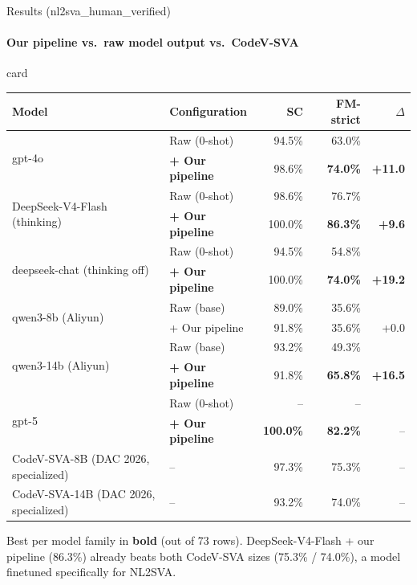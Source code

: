 \documentclass[aspectratio=169]{beamer}
\newenvironment{card}[1][\textwidth]{%
  \begin{beamercolorbox}[wd=#1,sep=8pt,rounded=true,shadow=false]{card}
}{%
  \end{beamercolorbox}
}
\begin{document}
\begin{frame}{Results (nl2sva\_human\_verified)}
  \framesubtitle{Our pipeline vs.\ raw model output vs.\ CodeV-SVA}
  \begin{card}
  \centering
  \tiny
  \renewcommand{\arraystretch}{0.85}
  \setlength{\tabcolsep}{6pt}
  \begin{tabular}{l l r r r}
    \toprule
    \textbf{Model} & \textbf{Configuration} & \textbf{SC} & \textbf{FM-strict} & \textbf{$\Delta$} \\
    \midrule
    \multirow{2}{*}{gpt-4o} & Raw (0-shot) & 94.5\% & 63.0\% & \\
      & \textbf{+ Our pipeline} & 98.6\% & \textbf{74.0\%} & \textbf{+11.0} \\
    \midrule
    \multirow{2}{*}{DeepSeek-V4-Flash (thinking)} & Raw (0-shot) & 98.6\% & 76.7\% & \\
      & \textbf{+ Our pipeline} & 100.0\% & \textbf{86.3\%} & \textbf{+9.6} \\
    \midrule
    \multirow{2}{*}{deepseek-chat (thinking off)} & Raw (0-shot) & 94.5\% & 54.8\% & \\
      & \textbf{+ Our pipeline} & 100.0\% & \textbf{74.0\%} & \textbf{+19.2} \\
    \midrule
    \multirow{2}{*}{qwen3-8b (Aliyun)} & Raw (base) & 89.0\% & 35.6\% & \\
      & + Our pipeline & 91.8\% & 35.6\% & +0.0 \\
    \midrule
    \multirow{2}{*}{qwen3-14b (Aliyun)} & Raw (base) & 93.2\% & 49.3\% & \\
      & \textbf{+ Our pipeline} & 91.8\% & \textbf{65.8\%} & \textbf{+16.5} \\
    \midrule
    \multirow{2}{*}{gpt-5} & Raw (0-shot) & -- & -- & \\
      & \textbf{+ Our pipeline} & \textbf{100.0\%} & \textbf{82.2\%} & -- \\
    \midrule
    CodeV-SVA-8B (DAC 2026, specialized) & -- & 97.3\% & 75.3\% & -- \\
    CodeV-SVA-14B (DAC 2026, specialized) & -- & 93.2\% & 74.0\% & -- \\
    \bottomrule
  \end{tabular}
  \end{card}
  \vspace{2pt}
  {\scriptsize\textcolor{nyumuted}{Best per model family in \textbf{bold} (out of 73 rows).
  DeepSeek-V4-Flash + our pipeline (86.3\%) already beats both CodeV-SVA sizes
  (75.3\% / 74.0\%), a model finetuned specifically for NL2SVA.}}
\end{frame}
\end{document}
